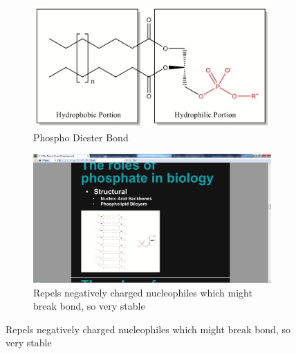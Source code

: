 \documentclass[]{article}
\begin{document}
\begin{figure}[H]
	\caption{Phospholipids}\label{fig:PhosphoLipids}
	
	\begin{subfigure}[b]{0.45\textwidth}
		\centering
		\caption{Phospho Diester Bond}\label{fig:PhosphoLipid1} 
		\includegraphics[width=\textwidth]{PhosphoLipid1}
	\end{subfigure}
	\begin{subfigure}[b]{0.45\textwidth}
		\centering
		\caption{Repels negatively charged nucleophiles which might break bond, so very stable}\label{fig:PhosphoLipid2} 
		\includegraphics[width=\textwidth]{PhosphoLipid2}
	\end{subfigure}
	

\end{figure}
\end{document}
